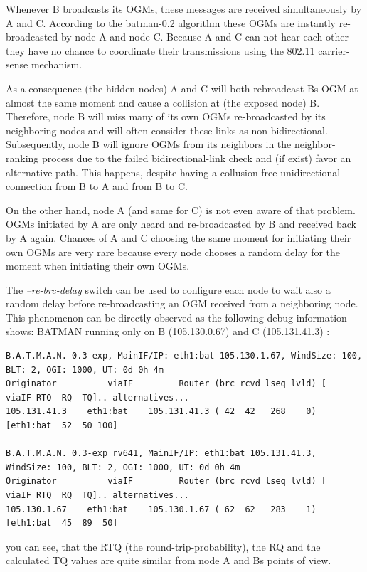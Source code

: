 \documentclass[11pt]{article}
\begin{document}
Whenever B broadcasts its OGMs, these messages are received simultaneously by A and C. According to the batman-0.2 algorithm these OGMs are instantly re-broadcasted by node A and node C. Because A and C can not hear each other they have no chance to coordinate their transmissions using the 802.11 carrier-sense mechanism.

As a consequence (the hidden nodes) A and C will both rebroadcast Bs OGM at almost the same moment and cause a collision at (the exposed node) B. Therefore, node B will miss many of its own OGMs re-broadcasted by its neighboring nodes and will often consider these links as non-bidirectional. Subsequently, node B will ignore OGMs from its neighbors in the neighbor-ranking process due to the failed bidirectional-link check and (if exist) favor an alternative path. This happens, despite having a collusion-free unidirectional connection from B to A and from B to C.

On the other hand, node A (and same for C) is not even aware of that problem. OGMs initiated by A are only heard and re-broadcasted by B and received back by A again. Chances of A and C choosing the same moment for initiating their own OGMs are very rare because every node chooses a random delay for the moment when initiating their own OGMs.

The \emph{--re-brc-delay} switch can be used to configure each node to wait also a random delay before re-broadcasting an OGM received from a neighboring node.
%
This phenomenon can be directly observed as the following debug-information shows:
%
BATMAN running only on B (105.130.0.67) and C (105.131.41.3) :

\begin{small}
\begin{verbatim}
B.A.T.M.A.N. 0.3-exp, MainIF/IP: eth1:bat 105.130.1.67, WindSize: 100, BLT: 2, OGI: 1000, UT: 0d 0h 4m
Originator          viaIF         Router (brc rcvd lseq lvld) [   viaIF RTQ  RQ  TQ].. alternatives...
105.131.41.3    eth1:bat    105.131.41.3 ( 42  42   268    0) [eth1:bat  52  50 100]

B.A.T.M.A.N. 0.3-exp rv641, MainIF/IP: eth1:bat 105.131.41.3, WindSize: 100, BLT: 2, OGI: 1000, UT: 0d 0h 4m
Originator          viaIF         Router (brc rcvd lseq lvld) [   viaIF RTQ  RQ  TQ].. alternatives...
105.130.1.67    eth1:bat    105.130.1.67 ( 62  62   283    1) [eth1:bat  45  89  50]
\end{verbatim}
\end{small}

you can see, that the RTQ (the round-trip-probability), the RQ and the calculated TQ values 
are quite similar from node A and Bs points of view.
\end{document}
